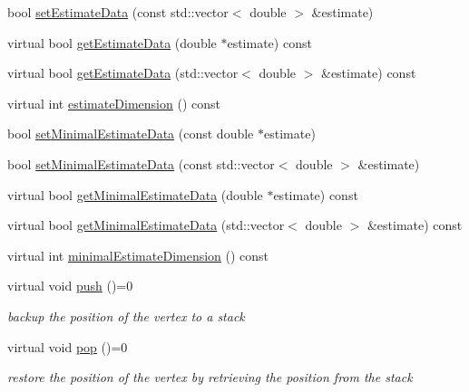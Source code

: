 \begin{DoxyCompactItemize}
\item 
bool \hyperlink{classg2o_1_1OptimizableGraph_1_1Vertex_a1cf16cd3b2e99169cdd6dfc139f926bc}{set\+Estimate\+Data} (const std\+::vector$<$ double $>$ \&estimate)
\item 
virtual bool \hyperlink{classg2o_1_1OptimizableGraph_1_1Vertex_af26618ca44b64685e2ea10f263b93182}{get\+Estimate\+Data} (double $\ast$estimate) const 
\item 
virtual bool \hyperlink{classg2o_1_1OptimizableGraph_1_1Vertex_a5664e886d4acaa3873ef9cf6ae18942d}{get\+Estimate\+Data} (std\+::vector$<$ double $>$ \&estimate) const 
\item 
virtual int \hyperlink{classg2o_1_1OptimizableGraph_1_1Vertex_ac8a19594a8356e9f104d8b383a10577e}{estimate\+Dimension} () const 
\item 
bool \hyperlink{classg2o_1_1OptimizableGraph_1_1Vertex_a57d42a1288d7377c593c91a8cf8a754c}{set\+Minimal\+Estimate\+Data} (const double $\ast$estimate)
\item 
bool \hyperlink{classg2o_1_1OptimizableGraph_1_1Vertex_ac41fda9360e81bf704681831b1df11f8}{set\+Minimal\+Estimate\+Data} (const std\+::vector$<$ double $>$ \&estimate)
\item 
virtual bool \hyperlink{classg2o_1_1OptimizableGraph_1_1Vertex_aff1e498690025bb1785c6313711adc99}{get\+Minimal\+Estimate\+Data} (double $\ast$estimate) const 
\item 
virtual bool \hyperlink{classg2o_1_1OptimizableGraph_1_1Vertex_acd8b1349bd9149b10e58797ccdabf6c7}{get\+Minimal\+Estimate\+Data} (std\+::vector$<$ double $>$ \&estimate) const 
\item 
virtual int \hyperlink{classg2o_1_1OptimizableGraph_1_1Vertex_a7dd3638e707eaf4f7e45b9f5ba77986d}{minimal\+Estimate\+Dimension} () const 
\item 
virtual void \hyperlink{classg2o_1_1OptimizableGraph_1_1Vertex_aa477ed33d30a01ed468f33bb2a2f2d9d}{push} ()=0
\begin{DoxyCompactList}\small\item\em backup the position of the vertex to a stack \end{DoxyCompactList}\item 
virtual void \hyperlink{classg2o_1_1OptimizableGraph_1_1Vertex_a3e36d925dbda1c574a285826ade5909a}{pop} ()=0
\begin{DoxyCompactList}\small\item\em restore the position of the vertex by retrieving the position from the stack \end{DoxyCompactList}\item 

\end{DoxyCompactItemize}
